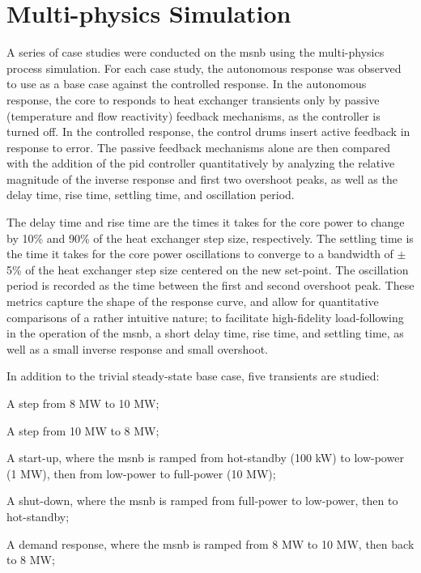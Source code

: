 \section{Multi-physics Simulation}\label{sec:simulation}
A series of case studies were conducted on the \acs{msnb} using the multi-physics process simulation. For each case study, the autonomous response was observed to use as a base case against the controlled response. In the autonomous response, the core to responds to heat exchanger transients only by passive (temperature and flow reactivity) feedback mechanisms, as the controller is turned off. In the controlled response, the control drums insert active feedback in response to error. The passive feedback mechanisms alone are then compared with the addition of the \acs{pid} controller quantitatively by analyzing the relative magnitude of the inverse response and first two overshoot peaks, as well as the delay time, rise time, settling time, and oscillation period. 

The delay time and rise time are the times it takes for the core power to change by 10\% and 90\% of the heat exchanger step size, respectively. The settling time is the time it takes for the core power oscillations to converge to a bandwidth of $\pm$5\% of the heat exchanger step size centered on the new set-point. The oscillation period is recorded as the time between the first and second overshoot peak. These metrics capture the shape of the response curve, and allow for quantitative comparisons of a rather intuitive nature; to facilitate high-fidelity load-following in the operation of the \acs{msnb}, a short delay time, rise time, and settling time, as well as a small inverse response and small overshoot. 

In addition to the trivial steady-state base case, five transients are studied:
\begin{enumerate*}
    \item A step from 8 MW to 10 MW;
    \item A step from 10 MW to 8 MW;
    \item A start-up, where the \acs{msnb} is ramped from hot-standby (100 kW) to low-power (1 MW), then from low-power to full-power (10 MW);
    \item A shut-down, where the \acs{msnb} is ramped from full-power to low-power, then to hot-standby;
    \item A demand response, where the \acs{msnb} is ramped from 8 MW to 10 MW, then back to 8 MW;
\end{enumerate*}

